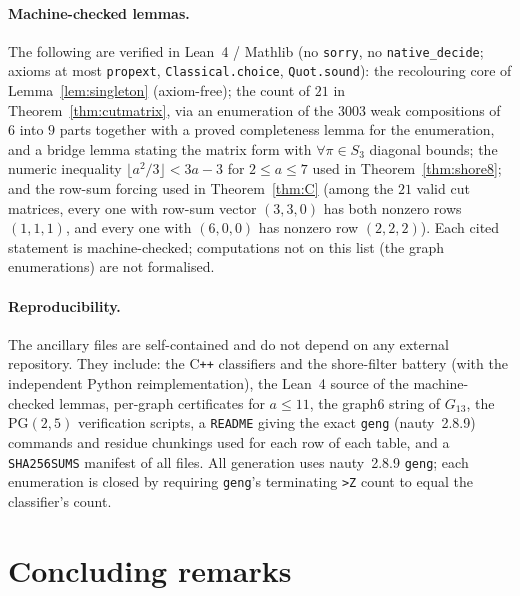 \documentclass[11pt]{article}
\theoremstyle{remark}
\begin{document}
\paragraph{Machine-checked lemmas.} The following are verified in Lean~4 /
Mathlib (no \texttt{sorry}, no \texttt{native\_decide}; axioms at most
\texttt{propext}, \texttt{Classical.choice}, \texttt{Quot.sound}):
the recolouring core of Lemma~\ref{lem:singleton} (axiom-free); the count of
$21$ in Theorem~\ref{thm:cutmatrix}, via an enumeration of the $3003$ weak
compositions of $6$ into $9$ parts together with a proved completeness lemma for
the enumeration, and a bridge lemma stating the matrix form with
$\forall\pi\in S_3$ diagonal bounds; the numeric inequality
$\lfloor a^2/3\rfloor<3a-3$ for $2\le a\le 7$ used in Theorem~\ref{thm:shore8};
and the row-sum forcing used in Theorem~\ref{thm:C} (among the $21$ valid cut
matrices, every one with row-sum vector $(3,3,0)$ has both nonzero rows $(1,1,1)$,
and every one with $(6,0,0)$ has nonzero row $(2,2,2)$). Each cited statement is
machine-checked; computations not on this list (the graph enumerations) are not
formalised.

\paragraph{Reproducibility.} The ancillary files are self-contained and do not
depend on any external repository. They include: the C\texttt{++} classifiers and
the shore-filter battery (with the independent Python reimplementation), the Lean~4
source of the machine-checked lemmas, per-graph certificates for $a\le 11$, the
graph6 string of $G_{13}$, the $\mathrm{PG}(2,5)$ verification scripts, a
\texttt{README} giving the exact \texttt{geng} (nauty~2.8.9) commands and residue
chunkings used for each row of each table, and a \texttt{SHA256SUMS} manifest of all
files. All generation uses nauty~2.8.9 \texttt{geng}; each enumeration is closed by
requiring \texttt{geng}'s terminating \texttt{>Z} count to equal the classifier's
count.

\section{Concluding remarks}
\end{document}
